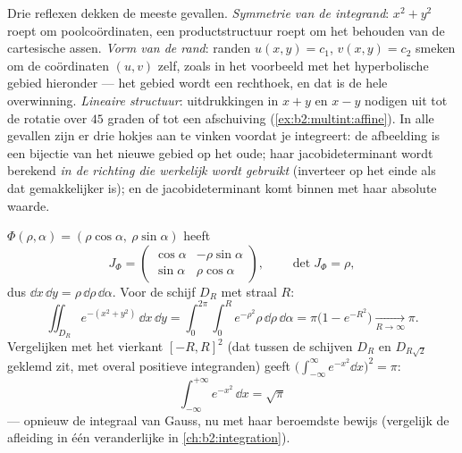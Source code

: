 \begin{remark}
Drie reflexen dekken de meeste gevallen. \emph{Symmetrie van de
integrand}: $x^2 + y^2$ roept om poolcoördinaten, een
productstructuur roept om het behouden van de cartesische assen.
\emph{Vorm van de rand}: randen $u(x,y) = c_1$, $v(x,y) = c_2$
smeken om de coördinaten $(u, v)$ zelf, zoals in het voorbeeld met
het hyperbolische gebied hieronder --- het gebied wordt een
rechthoek, en dat is de hele overwinning. \emph{Lineaire
structuur}: uitdrukkingen in $x + y$ en $x - y$ nodigen uit tot de
rotatie over $45$ graden of tot een afschuiving
(\cref{ex:b2:multint:affine}). In alle gevallen zijn er drie hokjes
aan te vinken voordat je integreert: de afbeelding is een bijectie
van het nieuwe gebied op het oude; haar jacobideterminant wordt
berekend \emph{in de richting die werkelijk wordt gebruikt}
(inverteer op het einde als dat gemakkelijker is); en de
jacobideterminant komt binnen met haar absolute waarde.
\end{remark}

\begin{example}[Poolcoördinaten]\label{ex:b2:multint:polar}
$\Phi(\rho, \alpha) = (\rho\cos\alpha,\ \rho\sin\alpha)$ heeft
\[
J_\Phi = \begin{pmatrix}
\cos\alpha & -\rho\sin\alpha\\
\sin\alpha & \rho\cos\alpha
\end{pmatrix},
\qquad \det J_\Phi = \rho ,
\]
dus $\dd x\,\dd y = \rho\,\dd\rho\,\dd\alpha$. Voor de schijf $D_R$
met straal $R$:
\[
\iint_{D_R} e^{-(x^2 + y^2)}\,\dd x\,\dd y
= \int_0^{2\pi}\!\!\int_0^R e^{-\rho^2}\rho\,\dd\rho\,\dd\alpha
= \pi\bigl(1 - e^{-R^2}\bigr)
\xrightarrow[R\to\infty]{} \pi .
\]
Vergelijken met het vierkant $[-R, R]^2$ (dat tussen de schijven
$D_R$ en $D_{R\sqrt2}$ geklemd zit, met overal positieve
integranden) geeft $\bigl(\int_{-\infty}^\infty
e^{-x^2}\dd x\bigr)^2 = \pi$:
\[
\boxed{\ \int_{-\infty}^{+\infty} e^{-x^2}\,\dd x = \sqrt{\pi}\ }
\]
--- opnieuw de integraal van Gauss, nu met haar beroemdste bewijs
(vergelijk de afleiding in één veranderlijke in
\cref{ch:b2:integration}).
\end{example}

